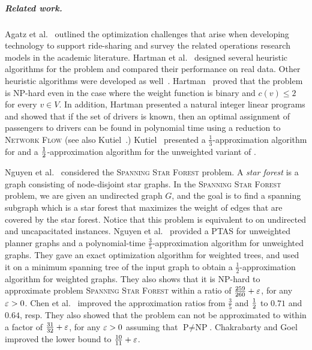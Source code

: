 
\subparagraph{Related work.}
%
Agatz et al.~\cite{agatz2012optimization} outlined the optimization
challenges that arise when developing technology to support
ride-sharing and survey the related operations research models in the
academic literature.
%
Hartman et al.~\cite{hartman2014theory} designed
several heuristic algorithms for the \carpool problem and compared
their performance on real data.  Other heuristic algorithms were
developed as well~\cite{knapen2014exploiting}.
%
Hartman~\cite{hartman2013optimal} proved that the \carpool problem is
NP-hard even in the case where the weight function is binary and
$c(v) \leq 2$ for every $v \in V$.  In addition, Hartman presented a
natural integer linear programs and showed that if the set of drivers
is known, then an optimal assignment of passengers to drivers can be
found in polynomial time using a reduction to \textsc{Network Flow}
(see also Kutiel~\cite{kutiel2016}.)
%
Kutiel~\cite{kutiel2016} presented a $\frac{1}{3}$-approximation
algorithm for \carpool and a $\frac{1}{2}$-approximation algorithm for the
unweighted variant of \carpool.


Nguyen et al.~\cite{nguyen2008approximating} considered
the \textsc{Spanning Star Forest} problem.  A \emph{star forest} is a
graph consisting of node-disjoint star graphs.  In
the \textsc{Spanning Star Forest} problem, we are given an undirected
graph $G$, and the goal is to find a spanning subgraph which is a star
forest that maximizes the weight of edges that are covered by the star
forest.  Notice that this problem is equivalent to \carpool on
undirected and uncapacitated instances.
%
Nguyen et al.~\cite{nguyen2008approximating} provided a PTAS for
unweighted planner graphs and a polynomial-time
$\frac{3}{5}$-approximation algorithm for unweighted graphs.  They
gave an exact optimization algorithm for weighted trees, and used it
on a minimum spanning tree of the input graph to obtain a
$\frac{1}{2}$-approximation algorithm for weighted graphs.  They also
shows that it is NP-hard to approximate problem \textsc{Spanning Star
Forest} within a ratio of $\frac{259}{260}+\varepsilon$, for any $\varepsilon>0$.
%
%
Chen et al.~\cite{CENRRS13} improved the approximation ratios from
$\frac{3}{5}$ and $\frac{1}{2}$ to $0.71$ and $0.64$, resp.  They also
showed that the problem can not be approximated to within a factor of
$\frac{31}{32} + \varepsilon$, for any $\varepsilon > 0$ assuming that
$\text{P} \neq \text{NP}$.
%
Chakrabarty and Goel~\cite{ChakrabartyGoel10} improved the lower bound
to $\frac{10}{11} + \varepsilon$.

